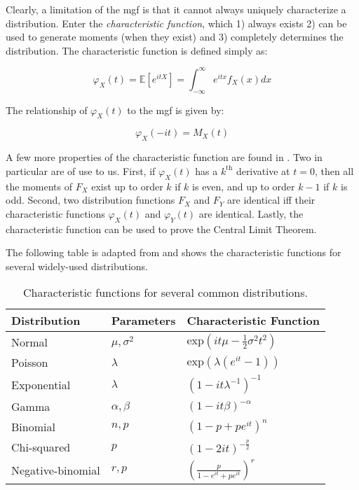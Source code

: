 \documentclass{report}
\renewcommand{\arraystretch}{1.5}
\begin{document}
Clearly, a limitation of the \gls{mgf} is that it cannot always uniquely characterize a distribution. Enter the \textit{characteristic function}, which 1) always exists 2) can be used to generate moments (when they exist) and 3) completely determines the distribution. The characteristic function is defined simply as:

\begin{equation}\label{eq:characteristic-function-1}
    \varphi_X(t) = \mathbb{E}\left[e^{itX}\right] = \int_{-\infty}^\infty e^{itx} f_X(x) dx
\end{equation}

The relationship of $\varphi_X(t)$ to the \gls{mgf} is given by:

\begin{equation}\label{characteristic-function-2}
    \varphi_X(-it) = M_X(t)
\end{equation}

A few more properties of the characteristic function are found in \cite{oberhettinger_fourier_1973}. Two in particular are of use to us. First, if $\varphi_X(t)$ has a $k^{\text{th}}$ derivative at $t = 0$, then all the moments of $F_X$ exist up to order $k$ if $k$ is even, and up to order $k-1$ if $k$ is odd. Second, two distribution functions $F_X$ and $F_Y$ are identical \gls{iff} their characteristic functions $\varphi_X(t)$ and $\varphi_Y(t)$ are identical. Lastly, the characteristic function can be used to prove the Central Limit Theorem. 

The following table is adapted from \cite{oberhettinger_fourier_1973} and shows the characteristic functions for several widely-used distributions. 

\renewcommand{\arraystretch}{2}

\begin{table}[h!]
\centering
\begin{tabular}{||l l l||} 
 \hline
 \textbf{Distribution} & \textbf{Parameters} & \textbf{Characteristic Function} \\ [0.5ex] 
  \hline\hline
  Normal & $\mu, \sigma^2$ & $\text{exp}\left(it\mu -\frac{1}{2}\sigma^2t^2\right)$ \\
  \hline
  Poisson & $\lambda$ & $\text{exp}\left(\lambda(e^{it} - 1)\right)$ \\
  \hline
  Exponential & $\lambda$ & $\left(1 - it\lambda^{-1}\right)^{-1}$ \\
  \hline 
  Gamma & $\alpha, \beta$ & $\left(1 - it\beta\right)^{-\alpha}$ \\
  \hline 
  Binomial & $n, p$ & $\left(1 - p + pe^{it}\right)^n$ \\
  \hline 
  Chi-squared & $p$ & $(1 - 2it)^{-\frac{p}{2}}$ \\
  \hline 
  Negative-binomial & $r, p$ & $\left(\frac{p}{1 - e^{it} + pe^{it}}\right)^r$ \\
  \hline 
\end{tabular}
\caption{Characteristic functions for several common distributions.}
\label{table:characteristic-functions}
\end{table}
\end{document}
